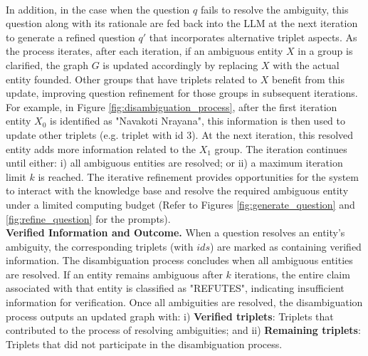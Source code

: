 \documentclass[11pt]{article}
\begin{document}
\\
In addition, in the case when the question $q$ fails to resolve the ambiguity, this question along with its rationale are fed back into the LLM at the next iteration to generate a refined question $q'$ that incorporates alternative triplet aspects. As the process iterates, after each iteration, if an ambiguous entity $X$ in a group is clarified, the graph $G$ is updated accordingly by replacing $X$ with the actual entity founded. Other groups that have triplets related to $X$ benefit from this update, improving question refinement for those groups in subsequent iterations. For example, in Figure \ref{fig:disambiguation_process}, after the first iteration entity $X_0$ is identified as "Navakoti Nrayana", this information is then used to update other triplets (e.g. triplet with id 3). At the next iteration, this resolved entity adds more information related to the $X_1$ group. The iteration continues until either: i) all ambiguous entities are resolved; or ii) a maximum iteration limit $k$ is reached. The iterative refinement provides opportunities for the system to interact with the knowledge base and resolve the required ambiguous entity under a limited computing budget (Refer to Figures \ref{fig:generate_question} and \ref{fig:refine_question} for the prompts).
\\
\textbf{Verified Information and Outcome.}
When a question resolves an entity’s ambiguity, the corresponding triplets (with $ids$) are marked as containing verified information. The disambiguation process concludes when all ambiguous entities are resolved. If an entity remains ambiguous after $k$ iterations, the entire claim associated with that entity is classified as "REFUTES", indicating insufficient information for verification. Once all ambiguities are resolved, the disambiguation process outputs an updated graph with: i) \textbf{Verified triplets}: Triplets that contributed to the process of resolving ambiguities; and ii) \textbf{Remaining triplets}: Triplets that did not participate in the disambiguation process.
\end{document}
